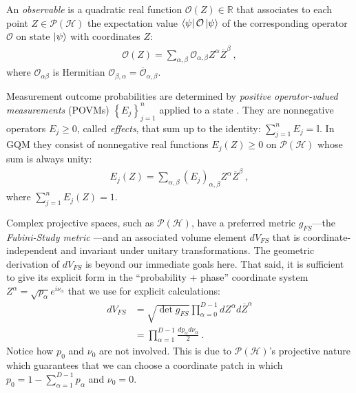 \documentclass[nofootinbib,pre,twocolumn,showpacs,showkeys,groupaddress,preprintnumbers,floatfix]{revtex4-1}
\newcommand{\1}{\mathbbm{1}}
\begin{document}
An \emph{observable} is a quadratic real function $\mathcal{O}(Z) \in
\mathbb{R}$ that associates to each point  $Z \in \mathcal{P}(\mathcal{H})$ the
expectation value $\bra{\psi} \mathcal{O} \ket{\psi}$ of the corresponding
operator $\mathcal{O}$ on state $\ket{\psi}$ with coordinates $Z$:
\begin{align}
\mathcal{O}(Z) = \sum_{\alpha,\beta} \mathcal{O}_{\alpha,\beta}Z^\alpha \overline{Z}^\beta
  ~,
\label{eq:GQM_Observable}
\end{align}
where $\mathcal{O}_{\alpha \beta}$ is Hermitian $\mathcal{O}_{\beta,\alpha} = \overline{\mathcal{O}}_{\alpha,\beta}$.

Measurement outcome probabilities are determined by \emph{positive
operator-valued measurements} (POVMs) $\left\{E_j\right\}_{j=1}^n$ applied to a
state \cite{Nielsen2010,Heinosaari2012}. They are nonnegative operators
$E_j\geq 0$, called \emph{effects}, that sum up to the identity: $\sum_{j=1}^n
E_j = \mathbb{I}$. In GQM they consist of nonnegative real functions $E_j(Z)\ge
0$ on $\mathcal{P}(\mathcal{H})$ whose sum is always unity:
\begin{align}
E_j(Z) = \sum_{\alpha,\beta}
  \left(E_j\right)_{\alpha,\beta} Z^\alpha \overline{Z}^\beta
  ~,
\label{eq:GQM_POVMs}
\end{align}
where $\sum_{j=1}^{n}E_j(Z) = 1$.

Complex projective spaces, such as $\mathcal{P}(\mathcal{H})$, have a preferred
metric $g_{FS}$---the \emph{Fubini-Study metric} \cite{Bengtsson2017}---and an
associated volume element $dV_{FS}$ that is coordinate-independent and
invariant under unitary transformations. The geometric derivation of $dV_{FS}$
is beyond our immediate goals here. That said, it is sufficient to give its
explicit form in the ``probability + phase'' coordinate system $Z^{\alpha} =
\sqrt{p_\alpha}e^{i\nu_\alpha}$ that we use for explicit calculations: 
\begin{align*}
dV_{FS}
  & = \sqrt{\det g_{FS}}
  \prod_{\alpha=0}^{D-1} dZ^\alpha d\overline{Z}^\alpha \\
  & =  \prod_{\alpha=1}^{D-1} \frac{dp_\alpha d\nu_\alpha}{2}
  ~.
\end{align*}
Notice how $p_0$ and $\nu_0$ are not involved. This is due to
$\mathcal{P}(\mathcal{H})$'s projective nature which guarantees that we can
choose a coordinate patch in which $p_0 = 1 - \sum_{\alpha=1}^{D-1}p_\alpha$
and $\nu_0 = 0$.
\end{document}
